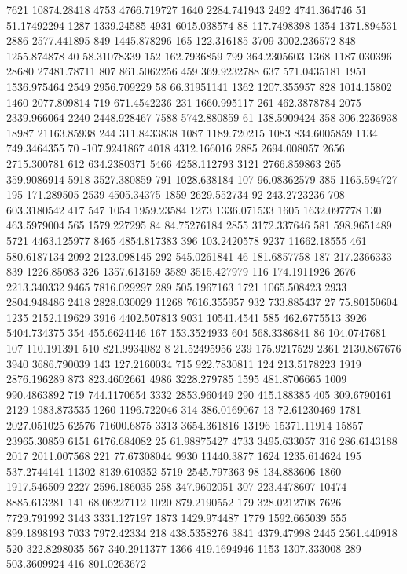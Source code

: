 7621	10874.28418
4753	4766.719727
1640	2284.741943
2492	4741.364746
51	51.17492294
1287	1339.24585
4931	6015.038574
88	117.7498398
1354	1371.894531
2886	2577.441895
849	1445.878296
165	122.316185
3709	3002.236572
848	1255.874878
40	58.31078339
152	162.7936859
799	364.2305603
1368	1187.030396
28680	27481.78711
807	861.5062256
459	369.9232788
637	571.0435181
1951	1536.975464
2549	2956.709229
58	66.31951141
1362	1207.355957
828	1014.15802
1460	2077.809814
719	671.4542236
231	1660.995117
261	462.3878784
2075	2339.966064
2240	2448.928467
7588	5742.880859
61	138.5909424
358	306.2236938
18987	21163.85938
244	311.8433838
1087	1189.720215
1083	834.6005859
1134	749.3464355
70	-107.9241867
4018	4312.166016
2885	2694.008057
2656	2715.300781
612	634.2380371
5466	4258.112793
3121	2766.859863
265	359.9086914
5918	3527.380859
791	1028.638184
107	96.08362579
385	1165.594727
195	171.289505
2539	4505.34375
1859	2629.552734
92	243.2723236
708	603.3180542
417	547
1054	1959.23584
1273	1336.071533
1605	1632.097778
130	463.5979004
565	1579.227295
84	84.75276184
2855	3172.337646
581	598.9651489
5721	4463.125977
8465	4854.817383
396	103.2420578
9237	11662.18555
461	580.6187134
2092	2123.098145
292	545.0261841
46	181.6857758
187	217.2366333
839	1226.85083
326	1357.613159
3589	3515.427979
116	174.1911926
2676	2213.340332
9465	7816.029297
289	505.1967163
1721	1065.508423
2933	2804.948486
2418	2828.030029
11268	7616.355957
932	733.885437
27	75.80150604
1235	2152.119629
3916	4402.507813
9031	10541.4541
585	462.6775513
3926	5404.734375
354	455.6624146
167	153.3524933
604	568.3386841
86	104.0747681
107	110.191391
510	821.9934082
8	21.52495956
239	175.9217529
2361	2130.867676
3940	3686.790039
143	127.2160034
715	922.7830811
124	213.5178223
1919	2876.196289
873	823.4602661
4986	3228.279785
1595	481.8706665
1009	990.4863892
719	744.1170654
3332	2853.960449
290	415.188385
405	309.6790161
2129	1983.873535
1260	1196.722046
314	386.0169067
13	72.61230469
1781	2027.051025
62576	71600.6875
3313	3654.361816
13196	15371.11914
15857	23965.30859
6151	6176.684082
25	61.98875427
4733	3495.633057
316	286.6143188
2017	2011.007568
221	77.67308044
9930	11440.3877
1624	1235.614624
195	537.2744141
11302	8139.610352
5719	2545.797363
98	134.883606
1860	1917.546509
2227	2596.186035
258	347.9602051
307	223.4478607
10474	8885.613281
141	68.06227112
1020	879.2190552
179	328.0212708
7626	7729.791992
3143	3331.127197
1873	1429.974487
1779	1592.665039
555	899.1898193
7033	7972.42334
218	438.5358276
3841	4379.47998
2445	2561.440918
520	322.8298035
567	340.2911377
1366	419.1694946
1153	1307.333008
289	503.3609924
416	801.0263672
